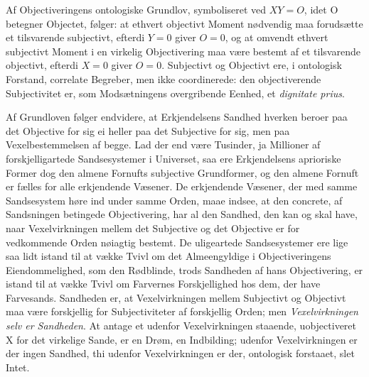 \documentclass[12pt]{article}
\newcommand{\opage}[1]{\marginnote{\footnotesize\textit{[#1]}}}
\begin{document}
Af Objectiveringens ontologiske Grundlov, symboliseret
ved $XY = O$, idet O betegner Objectet, følger: at ethvert
objectivt Moment nødvendig maa forudsætte et tilsvarende
subjectivt, efterdi $Y = 0$ giver $O = 0$, og at omvendt ethvert
subjectivt Moment i en virkelig Objectivering maa være bestemt
af et tilsvarende objectivt, efterdi $X = 0$ giver $O = 0$.
Subjectivt og Objectivt ere, i ontologisk Forstand, correlate
Begreber, men ikke coordinerede: den objectiverende Subjectivitet er,
som Modsætningens overgribende Eenhed, et \textit{dignitate prius}.

Af Grundloven følger endvidere, at Erkjendelsens Sandhed
hverken beroer paa det Objective for sig ei heller paa det
Subjective for sig, men paa Vexelbestemmelsen af begge. Lad der
end være Tusinder, ja Millioner af forskjelligartede
Sandsesystemer i Universet, saa ere Erkjendelsens aprioriske Former
dog den almene Fornufts subjective Grundformer, og den almene
Fornuft er fælles for alle erkjendende Væsener. De erkjendende
Væsener, der med samme Sandsesystem høre ind under samme
\opage{27} Orden, maae indsee, at den concrete, af Sandsningen betingede
Objectivering, har al den Sandhed, den kan og skal have, naar
Vexelvirkningen mellem det Subjective og det Objective er for
vedkommende Orden nøiagtig bestemt. De uligeartede
Sandsesystemer ere lige saa lidt istand til at vække Tvivl om det
Almeengyldige i Objectiveringens Eiendommelighed, som den
Rødblinde, trods Sandheden af hans Objectivering, er istand til at
vække Tvivl om Farvernes Forskjellighed hos dem, der have
Farvesands. Sandheden er, at Vexelvirkningen mellem Subjectivt
og Objectivt maa være forskjellig for Subjectiviteter af
forskjellig Orden; men \emph{Vexelvirkningen selv er Sandheden}. At
antage et udenfor Vexelvirkningen staaende, uobjectiveret X for
det virkelige Sande, er en Drøm, en Indbilding; udenfor
Vexelvirkningen er der ingen Sandhed, thi udenfor
Vexelvirkningen er der, ontologisk forstaaet, slet Intet.


\end{document}
